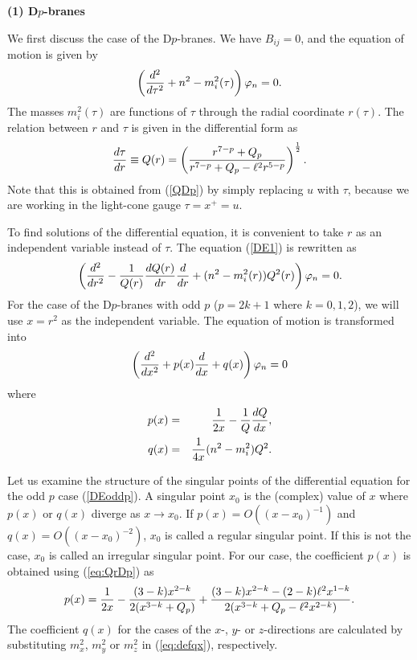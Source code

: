 \documentclass[a4paper,12pt]{article}
\begin{document}
\noindent
{\bf (1) D$p$-branes}
\medskip

\noindent
We first discuss the case of the D$p$-branes.
We have $B_{ij}=0$, and the equation
of motion is given by
\begin{equation}
\left({d^2\over d\tau^2}+n^{2}-m_{i}^2(\tau) \right)\varphi_{n}=0.
\label{DE1}
\end{equation}
The masses  $m^{2}_{i}(\tau)$
are functions of $\tau$ through the radial coordinate $r(\tau)$.
The relation between $r$ and $\tau$ is given in the
differential form as 
\begin{equation} 
{d\tau\over dr}\equiv Q(r)=\left({r^{7-p}+Q_{p}\over 
r^{7-p}+Q_{p}-\ell^2 r^{5-p}}\right)^{1\over2}.
\label{eq:QrDp}
\end{equation}
Note that this is obtained from (\ref{QDp}) by
simply replacing $u$ with $\tau$, because we are working 
in the light-cone gauge $\tau=x^{+}=u$.

To find solutions of the differential equation,
it is convenient to take $r$ as an independent variable 
instead of $\tau$. The equation
(\ref{DE1}) is rewritten as
\begin{equation}
\left({d^2\over dr^2}-{1\over Q(r)}{dQ(r)\over dr} {d\over dr}
+(n^2-m_{i}^2(r))Q^2(r)\right) \varphi_{n}=0.
\label{DE2}
\end{equation}
For the case of the D$p$-branes with odd $p$ ($p=2k+1$ where $k=0,1,2$),
we will use $x=r^2$ as the independent variable. 
The equation of motion is transformed into 
\begin{equation}
\left({d^2\over dx^2} +p(x){d\over dx}+q(x)\right) \varphi_{n}=0
\label{DEoddp}
\end{equation}
where 
\begin{eqnarray}
p(x)&=& {1\over 2x}-{1\over Q}{d Q\over dx},\label{eq:defpx}\\
q(x)&=& {1\over 4x}(n^2-m_{i}^2)Q^2\label{eq:defqx}.
\end{eqnarray}

Let us examine the structure of the singular points
of the differential equation for the odd $p$ case (\ref{DEoddp}). 
A singular point $x_{0}$ is the (complex) value of 
$x$ where $p(x)$ or $q(x)$ diverge as $x\rightarrow x_{0}$. 
If $p(x)=O((x-x_{0})^{-1})$ and $q(x)=O((x-x_{0})^{-2})$, 
$x_{0}$ is called a regular singular point. 
If this is not the case, $x_{0}$ is
called an irregular singular point. 
For our case, the coefficient $p(x)$ is
obtained using (\ref{eq:QrDp}) as
\begin{equation}
p(x)={1\over 2x}-{(3-k) x^{2-k}\over 2(x^{3-k}+Q_p)}
+{(3-k)x^{2-k}-(2-k)\ell^2 x^{1-k}\over
2(x^{3-k}+Q_p-\ell^2 x^{2-k})}.
\label{pxDp}
\end{equation}
The coefficient $q(x)$ for the cases of the
$x$-, $y$- or $z$-directions are calculated 
by substituting  $m^2_{x}$, $m^2_{y}$ or $m^2_{z}$ 
in (\ref{eq:defqx}), respectively.
\end{document}
